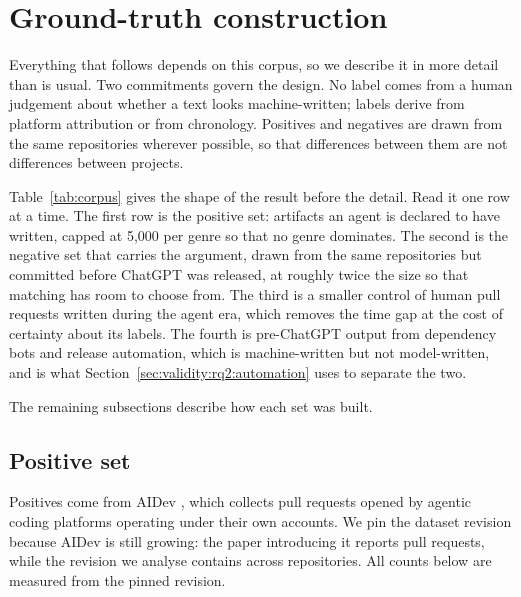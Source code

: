 \section{Ground-truth construction}
\label{sec:groundtruth}

Everything that follows depends on this corpus, so we describe it in more detail than is
usual. Two commitments govern the design. No label comes from a human judgement about
whether a text looks machine-written; labels derive from platform attribution or from
chronology. Positives and negatives are drawn from the same repositories wherever
possible, so that differences between them are not differences between projects.



Table~\ref{tab:corpus} gives the shape of the result before the detail. Read it one row
at a time. The first row is the positive set: artifacts an agent is declared to have
written, capped at 5{,}000 per genre so that no genre dominates. The second is the
negative set that carries the argument, drawn from the same repositories but committed
before ChatGPT was released, at roughly twice the size so that matching has room to
choose from. The third is a smaller control of human pull requests written during the
agent era, which removes the time gap at the cost of certainty about its labels. The
fourth is pre-ChatGPT output from dependency bots and release automation, which is
machine-written but not model-written, and is what
Section~\ref{sec:validity:rq2:automation} uses to separate the two.

The remaining subsections describe how each set was built.

\subsection{Positive set}
\label{sec:groundtruth:positives}

Positives come from AIDev \citep{li2025aidev}, which collects pull requests opened by
agentic coding platforms operating under their own accounts. We pin the dataset revision
because AIDev is still growing: the paper introducing it reports 
pull requests, while the revision we analyse contains \AidevPRs{} across \AidevRepos{}
repositories. All counts below are measured from the pinned revision.

